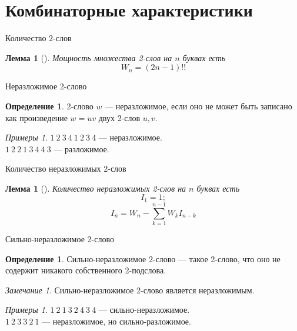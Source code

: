 \documentclass[14pt, aspectratio=169, notheorems]{beamer}
\theoremstyle{plain}
\newtheorem{lemma}[theorem]{Лемма}
\theoremstyle{definition}
\newtheorem{definition}[theorem]{Определение}
\theoremstyle{remark}
\newtheorem{examples}[theorem]{Примеры}
\newtheorem{remark}[theorem]{Замечание}
\begin{document}
\section{Комбинаторные характеристики}

\begin{frame}{Количество 2-слов}
    \begin{lemma}[]
    Мощность множества 2-слов на $n$ буквах есть 
    \[
    W_n = (2n - 1)!!
    \]
    \end{lemma}
\end{frame}

\begin{frame}{Неразложимое 2-слово}
    \begin{definition}
    2-слово $w$ --- неразложимое, если оно не может быть записано как произведение $w = uv$ двух 2-слов $u, v$.
    \end{definition}
    \begin{examples}
    $1\ 2\ 3\ 4\ 1\ 2\ 3\ 4$ --- неразложимое. \\
    $1\ 2\ 2\ 1\ 3\ 4\ 4\ 3$ --- разложимое.
    \end{examples}
\end{frame}

\begin{frame}{Количество неразложимых 2-слов}
    \begin{lemma}[]
    Количество неразложимых 2-слов на $n$ буквах есть 
    \begin{equation*}
        I_1 = 1; 
    \end{equation*}
    \begin{equation*}
        I_n = W_n - \sum_{k = 1}^{n - 1}W_kI_{n - k}
    \end{equation*}
    \end{lemma}
\end{frame}

\begin{frame}{Сильно-неразложимое 2-слово}
    \begin{definition}
    Сильно-неразложимое 2-слово --- такое 2-слово, что оно не содержит никакого собственного 2-подслова.
    \end{definition}
    \begin{remark}
    Сильно-неразложимое 2-слово является неразложимым.
    \end{remark}
    \begin{examples}
    $1\ 2\ 1\ 3\ 2\ 4\ 3\ 4$ --- сильно-неразложимое. \\
    $1\ 2\ 3\ 3\ 2\ 1$ --- неразложимое, но сильно-разложимое.
    \end{examples}
\end{frame}
\end{document}
